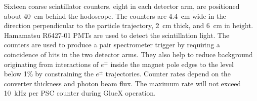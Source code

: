 Sixteen coarse scintillator counters, eight in each detector arm, are
positioned about 40~cm behind the hodoscope.  The counters are 4.4~cm
wide in the direction perpendicular to the particle trajectory, 2~cm
thick, and 6~cm in height.  Hamamatsu R6427-01 PMTs are used to detect
the scintillation light. The counters are used to produce a pair
spectrometer trigger by requiring a coincidence of hits in the two
detector arms. They also help to reduce background originating from
interactions of $e^\pm$ inside the magnet pole edges to the level
below 1\% by constraining the $e^\pm$ trajectories.  Counter rates
depend on the converter thickness and photon beam flux. The maximum
rate will not exceed 10~kHz per PSC counter during GlueX operation.


%
%
